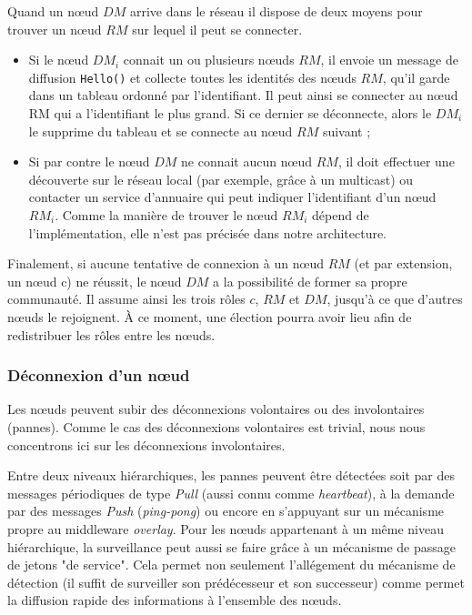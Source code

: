 Quand un n{\oe}ud $DM$ arrive dans le réseau il dispose de deux moyens pour trouver un n{\oe}ud $RM$ sur lequel il peut se connecter. 
\begin{itemize}
	\item Si le n{\oe}ud $DM_i$ connait un ou plusieurs n{\oe}uds $RM$, il envoie un message de diffusion \texttt{Hello()} et collecte toutes les identités des n{\oe}uds $RM$, qu'il garde dans un tableau ordonné par l'identifiant. Il peut ainsi se connecter au n{\oe}ud RM qui a l'identifiant le plus grand. Si ce dernier se déconnecte, alors le $DM_i$ le supprime du tableau et se connecte au n{\oe}ud $RM$ suivant ; 
	\item Si par contre le n{\oe}ud $DM$ ne connait aucun n{\oe}ud $RM$, il doit effectuer une découverte sur le réseau local (par exemple, grâce à un multicast) ou contacter un service d'annuaire qui peut indiquer l'identifiant d'un n{\oe}ud $RM_i$. Comme la manière de trouver le n{\oe}ud $RM_i$ dépend de l'implémentation, elle n'est pas précisée dans notre architecture.
\end{itemize}
Finalement, si aucune tentative de connexion à un n{\oe}ud $RM$ (et par extension, un n{\oe}ud c) ne réussit, le n{\oe}ud $DM$ a la possibilité de former sa propre communauté. Il assume ainsi les trois rôles $c$, $RM$ et $DM$, jusqu'à ce que d'autres n{\oe}uds le rejoignent. À ce moment, une élection pourra avoir lieu afin de redistribuer les rôles entre les n{\oe}uds.

\subsubsection{Déconnexion d'un n{\oe}ud} 

Les n{\oe}uds peuvent subir des déconnexions volontaires ou des involontaires (pannes). Comme le cas des déconnexions volontaires est trivial, nous nous concentrons ici sur les déconnexions involontaires.

Entre deux niveaux hiérarchiques, les pannes peuvent être détectées soit par des messages périodiques de type \textit{Pull} (aussi connu comme \textit{heartbeat}), à la demande par des messages \textit{Push} (\textit{ping-pong}) \cite{Chandra96} ou encore en s'appuyant sur un mécanisme propre au middleware \textit{overlay}. Pour les n{\oe}uds appartenant à un même niveau hiérarchique, la surveillance peut aussi se faire grâce à un mécanisme de passage de jetons "de service". Cela permet non seulement l'allégement du mécanisme de détection (il suffit de surveiller son prédécesseur et son successeur) comme permet la diffusion rapide des informations à l'ensemble des n{\oe}uds.

